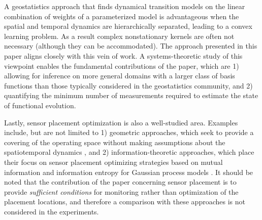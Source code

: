 A geostatistics approach that finds dynamical transition models on the linear combination of weights of a parameterized model \cite{cressie2011statistics,mardia1998kriged} is advantageous when the spatial and temporal dynamics are hierarchically separated, leading to a convex learning problem. As a result complex nonstationary kernels are often not necessary (although they can be accommodated). The approach presented in this paper aligns closely with this vein of work. %
A systems-theoretic study of this viewpoint enables the fundamental contributions of the paper, which are 1) allowing for inference on more general domains with a larger class of basis functions than those typically considered in the geostatistics community, and 2) quantifying the minimum number of measurements required to estimate the state of functional evolution. 

Lastly, sensor placement optimization is also a well-studied area. Examples include, but are not limited to 1) geometric approaches, which seek to provide a covering of the operating space without making assumptions about the spatiotemporal dynamics \cite{egerstedt:bk:2010}, and 2) information-theoretic approaches, which place their focus on sensor placement optimizing strategies based on mutual information and information entropy for Gaussian process models \cite{Guestrin05_ICML}.
It should be noted that the contribution of the paper concerning sensor placement is to provide \emph{sufficient conditions} for monitoring rather than optimization of the placement locations, and therefore a comparison with these approaches is not considered in the experiments. 

